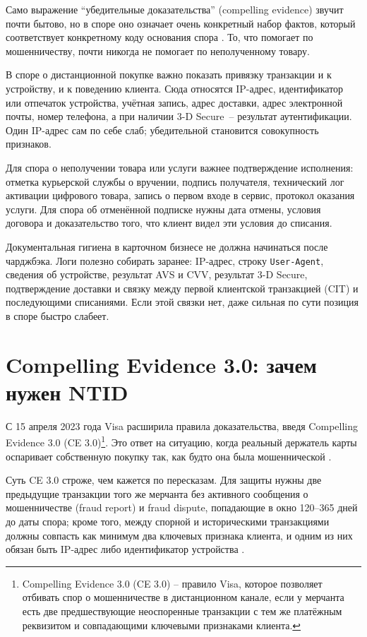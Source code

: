 Само выражение \enquote{убедительные доказательства} (compelling evidence)
звучит почти бытово, но в споре оно означает очень конкретный набор
фактов, который соответствует конкретному коду основания спора
\cite{visa-dispute-rules}.
То, что помогает по мошенничеству, почти никогда не помогает по
неполученному товару.

В споре о дистанционной покупке важно показать привязку транзакции
и к устройству, и к поведению клиента. Сюда относятся IP-адрес,
идентификатор или отпечаток устройства,
учётная запись, адрес доставки, адрес электронной почты, номер телефона,
а при наличии 3-D Secure~-- результат аутентификации. Один IP-адрес
сам по себе слаб; убедительной становится совокупность признаков.

Для спора о неполучении товара или услуги важнее подтверждение
исполнения: отметка курьерской службы о вручении, подпись получателя,
технический лог активации цифрового товара, запись о первом входе в
сервис, протокол оказания услуги. Для спора об отменённой подписке
нужны дата отмены, условия договора и доказательство того, что клиент
видел эти условия до списания.

Документальная гигиена в карточном бизнесе не должна начинаться
после чарджбэка. Логи полезно собирать заранее: IP-адрес, строку
\texttt{User-Agent}, сведения об устройстве, результат AVS и CVV,
результат 3-D Secure, подтверждение доставки и связку между первой
клиентской транзакцией (CIT) и последующими списаниями. Если этой
связки нет, даже сильная по сути позиция в споре быстро слабеет.

\section{Compelling Evidence 3.0: зачем нужен NTID}
\label{sec:disputes-ce30}

С 15 апреля 2023 года Visa расширила правила доказательства, введя
Compelling Evidence 3.0 (CE 3.0)\footnote{Compelling Evidence 3.0 (CE 3.0) -- правило Visa, которое позволяет отбивать спор о мошенничестве в дистанционном канале, если у мерчанта есть две предшествующие неоспоренные транзакции с тем же платёжным реквизитом и совпадающими ключевыми признаками клиента.}.
Это ответ на ситуацию, когда реальный держатель карты оспаривает
собственную покупку так, как будто она была мошеннической
\cite{visa-ce30-merchant-readiness}\cite{visa-dispute-rules}.

Суть CE 3.0 строже, чем кажется по пересказам. Для защиты нужны две
предыдущие транзакции того же мерчанта без активного сообщения о
мошенничестве (fraud report) и fraud dispute, попадающие в окно
120--365 дней до даты спора; кроме
того, между спорной и историческими транзакциями должны совпасть как
минимум два ключевых признака клиента, и одним из них обязан быть
IP-адрес либо идентификатор устройства
\cite{visa-ce30-merchant-readiness}.

